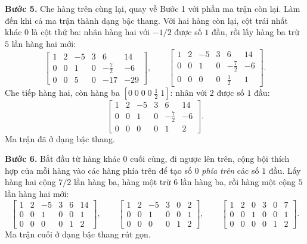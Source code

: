 \documentclass[12pt,a4paper]{article}
\begin{document}
\textbf{Bước 5.} Che hàng trên cùng lại, quay về Bước 1 với phần ma trận còn lại. Làm đến khi cả ma trận thành dạng bậc thang. Với hai hàng còn lại, cột trái nhất khác \(0\) là cột thứ ba: nhân hàng hai với \(-1/2\) được số \(1\) đầu, rồi lấy hàng ba trừ \(5\) lần hàng hai mới:
$$
\left[ \begin{array}{ccccc|c} 1 & 2 & -5 & 3 & 6 & 14 \\ 0 & 0 & 1 & 0 & -\frac72 & -6 \\ 0 & 0 & 5 & 0 & -17 & -29 \end{array} \right],\qquad
\left[ \begin{array}{ccccc|c} 1 & 2 & -5 & 3 & 6 & 14 \\ 0 & 0 & 1 & 0 & -\frac72 & -6 \\ 0 & 0 & 0 & 0 & \frac12 & 1 \end{array} \right].
$$
Che tiếp hàng hai, còn hàng ba \([0\;0\;0\;0\;\frac12\;1]\): nhân với \(2\) được số \(1\) đầu:
$$
\left[ \begin{array}{ccccc|c} 1 & 2 & -5 & 3 & 6 & 14 \\ 0 & 0 & 1 & 0 & -\frac72 & -6 \\ 0 & 0 & 0 & 0 & 1 & 2 \end{array} \right].
$$
Ma trận đã ở dạng bậc thang.

\textbf{Bước 6.} Bắt đầu từ hàng khác \(0\) cuối cùng, đi ngược lên trên, cộng bội thích hợp của mỗi hàng vào các hàng phía trên để tạo số \(0\) \emph{phía trên} các số \(1\) đầu. Lấy hàng hai cộng \(7/2\) lần hàng ba, hàng một trừ \(6\) lần hàng ba, rồi hàng một cộng \(5\) lần hàng hai mới:
$$
\left[ \begin{array}{ccccc|c} 1 & 2 & -5 & 3 & 6 & 14 \\ 0 & 0 & 1 & 0 & 0 & 1 \\ 0 & 0 & 0 & 0 & 1 & 2 \end{array} \right],\qquad
\left[ \begin{array}{ccccc|c} 1 & 2 & -5 & 3 & 0 & 2 \\ 0 & 0 & 1 & 0 & 0 & 1 \\ 0 & 0 & 0 & 0 & 1 & 2 \end{array} \right],\qquad
\left[ \begin{array}{ccccc|c} 1 & 2 & 0 & 3 & 0 & 7 \\ 0 & 0 & 1 & 0 & 0 & 1 \\ 0 & 0 & 0 & 0 & 1 & 2 \end{array} \right].
$$
Ma trận cuối ở dạng bậc thang rút gọn.
\end{document}
